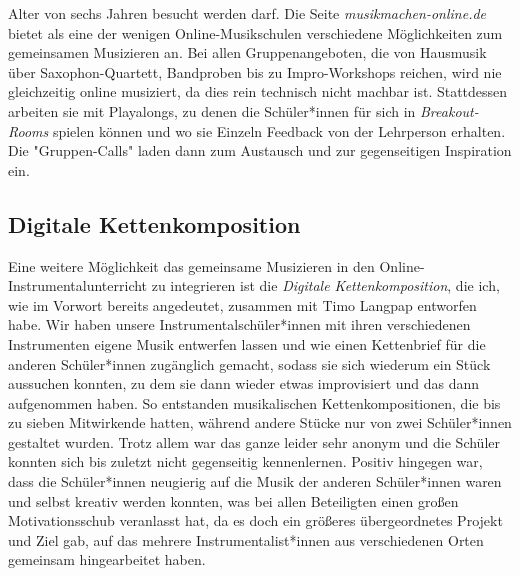 Alter von sechs Jahren besucht werden darf. \autocite{online_musikschule_emp}
Die Seite \emph{musikmachen-online.de} bietet als eine der wenigen
Online-Musikschulen verschiedene Möglichkeiten zum gemeinsamen Musizieren an.
\autocite{online_musikschule_mmo} Bei allen Gruppenangeboten, die von Hausmusik
über Saxophon-Quartett, Bandproben bis zu Impro-Workshops reichen, wird nie
gleichzeitig online musiziert, da dies rein technisch nicht machbar ist.
Stattdessen arbeiten sie mit Playalongs, zu denen die Schüler*innen für sich in
\emph{Breakout-Rooms} spielen können und wo sie Einzeln Feedback von der
Lehrperson erhalten. Die "Gruppen-Calls" laden dann zum Austausch und zur
gegenseitigen Inspiration ein. \autocite{online_musikschule_mmo}


\subsection{Digitale Kettenkomposition}
Eine weitere Möglichkeit das gemeinsame Musizieren in den
Online-Instrumentalunterricht zu integrieren ist die \emph{Digitale
Kettenkomposition}, die ich, wie im Vorwort bereits angedeutet, zusammen mit
Timo Langpap entworfen habe. Wir haben unsere Instrumentalschüler*innen mit
ihren verschiedenen Instrumenten eigene Musik entwerfen lassen und wie einen
Kettenbrief für die anderen Schüler*innen zugänglich gemacht, sodass sie sich
wiederum ein Stück aussuchen konnten, zu dem sie dann wieder etwas improvisiert
und das dann aufgenommen haben. So entstanden musikalischen Kettenkompositionen,
die bis zu sieben Mitwirkende hatten, während andere Stücke nur von zwei
Schüler*innen gestaltet wurden. Trotz allem war das ganze leider sehr anonym und
die Schüler konnten sich bis zuletzt nicht gegenseitig kennenlernen. Positiv
hingegen war, dass die Schüler*innen neugierig auf die Musik der anderen
Schüler*innen waren und selbst kreativ werden konnten, was bei allen Beteiligten
einen großen Motivationsschub veranlasst hat, da es doch ein größeres
übergeordnetes Projekt und Ziel gab, auf das mehrere Instrumentalist*innen aus
verschiedenen Orten gemeinsam hingearbeitet haben. 

